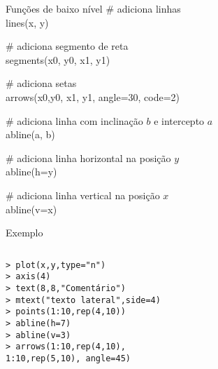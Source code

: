 \documentclass{beamer}
\begin{document}
\begin{frame}
  \begin{block}{Funções de baixo nível}
\# adiciona linhas\\
lines(x, y)\\  \vspace{10pt}

\# adiciona segmento de reta\\
segments(x0, y0, x1, y1)\\  \vspace{10pt}

\# adiciona setas\\
arrows(x0,y0, x1, y1, angle=30, code=2)\\  \vspace{10pt}

\# adiciona linha com inclinação $b$ e intercepto $a$\\
abline(a, b)\\  \vspace{10pt}

\# adiciona linha horizontal na posição $y$\\
abline(h=y)\\  \vspace{10pt}

\# adiciona linha vertical na posição $x$\\
abline(v=x)  \vspace{10pt}
  \end{block}
\end{frame}

\begin{frame}{Exemplo}
  \begin{columns}
    \begin{column}{6cm}
\texttt{\small > plot(x,y,type="n") \\
> axis(4)\\
> text(8,8,"Comentário")\\
> mtext("texto lateral",side=4)\\
> points(1:10,rep(4,10))\\
> abline(h=7)\\
> abline(v=3)\\
> arrows(1:10,rep(4,10), \\
1:10,rep(5,10), angle=45)
}
    \end{column}

    \begin{column}{6cm}
    \end{column}
  \end{columns}
\end{frame}
\end{document}
